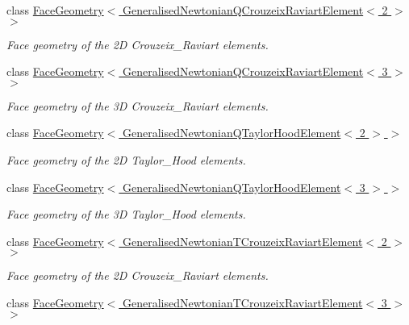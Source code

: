 \begin{DoxyCompactItemize}
\item 
class \hyperlink{classoomph_1_1FaceGeometry_3_01GeneralisedNewtonianQCrouzeixRaviartElement_3_012_01_4_01_4}{Face\+Geometry$<$ Generalised\+Newtonian\+Q\+Crouzeix\+Raviart\+Element$<$ 2 $>$ $>$}
\begin{DoxyCompactList}\small\item\em Face geometry of the 2D Crouzeix\+\_\+\+Raviart elements. \end{DoxyCompactList}\item 
class \hyperlink{classoomph_1_1FaceGeometry_3_01GeneralisedNewtonianQCrouzeixRaviartElement_3_013_01_4_01_4}{Face\+Geometry$<$ Generalised\+Newtonian\+Q\+Crouzeix\+Raviart\+Element$<$ 3 $>$ $>$}
\begin{DoxyCompactList}\small\item\em Face geometry of the 3D Crouzeix\+\_\+\+Raviart elements. \end{DoxyCompactList}\item 
class \hyperlink{classoomph_1_1FaceGeometry_3_01GeneralisedNewtonianQTaylorHoodElement_3_012_01_4_01_4}{Face\+Geometry$<$ Generalised\+Newtonian\+Q\+Taylor\+Hood\+Element$<$ 2 $>$ $>$}
\begin{DoxyCompactList}\small\item\em Face geometry of the 2D Taylor\+\_\+\+Hood elements. \end{DoxyCompactList}\item 
class \hyperlink{classoomph_1_1FaceGeometry_3_01GeneralisedNewtonianQTaylorHoodElement_3_013_01_4_01_4}{Face\+Geometry$<$ Generalised\+Newtonian\+Q\+Taylor\+Hood\+Element$<$ 3 $>$ $>$}
\begin{DoxyCompactList}\small\item\em Face geometry of the 3D Taylor\+\_\+\+Hood elements. \end{DoxyCompactList}\item 
class \hyperlink{classoomph_1_1FaceGeometry_3_01GeneralisedNewtonianTCrouzeixRaviartElement_3_012_01_4_01_4}{Face\+Geometry$<$ Generalised\+Newtonian\+T\+Crouzeix\+Raviart\+Element$<$ 2 $>$ $>$}
\begin{DoxyCompactList}\small\item\em Face geometry of the 2D Crouzeix\+\_\+\+Raviart elements. \end{DoxyCompactList}\item 
class \hyperlink{classoomph_1_1FaceGeometry_3_01GeneralisedNewtonianTCrouzeixRaviartElement_3_013_01_4_01_4}{Face\+Geometry$<$ Generalised\+Newtonian\+T\+Crouzeix\+Raviart\+Element$<$ 3 $>$ $>$}

\end{DoxyCompactItemize}
